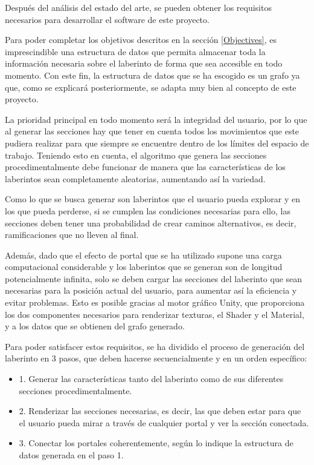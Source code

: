 \documentclass[../main.tex]{subfiles}
\begin{document}
Después del análisis del estado del arte, se pueden obtener los requisitos necesarios para desarrollar el software de este proyecto.

Para poder completar los objetivos descritos en la sección \ref{Objectives}, es imprescindible una estructura de datos que permita almacenar toda la información necesaria sobre el laberinto de forma que sea accesible en todo momento. Con este fin, la estructura de datos que se ha escogido es un grafo ya que, como se explicará posteriormente, se adapta muy bien al concepto de este proyecto.

La prioridad principal en todo momento será la integridad del usuario, por lo que al generar las secciones hay que tener en cuenta todos los movimientos que este pudiera realizar para que siempre se encuentre dentro de los límites del espacio de trabajo. Teniendo esto en cuenta, el algoritmo que genera las secciones procedimentalmente debe funcionar de manera que las características de los laberintos sean completamente aleatorias, aumentando así la variedad. 

Como lo que se busca generar son laberintos que el usuario pueda explorar y en los que pueda perderse, si se cumplen las condiciones necesarias para ello, las secciones deben tener una probabilidad de crear caminos alternativos, es decir, ramificaciones que no lleven al final. 

Además, dado que el efecto de portal que se ha utilizado supone una carga computacional considerable y los laberintos que se generan son de longitud potencialmente infinita, solo se deben cargar las secciones del laberinto que sean necesarias para la posición actual del usuario, para aumentar así la eficiencia y evitar problemas. Esto es posible gracias al motor gráfico Unity, que proporciona los dos componentes necesarios para renderizar texturas, el Shader y el Material, y a los datos que se obtienen del grafo generado.

Para poder satisfacer estos requisitos, se ha dividido el proceso de generación del laberinto en 3 pasos, que deben hacerse secuencialmente y en un orden específico:

\begin{itemize}
    \item 1. Generar las características tanto del laberinto como de sus diferentes secciones procedimentalmente.
    \item 2. Renderizar las secciones necesarias, es decir, las que deben estar para que el usuario pueda mirar a través de cualquier portal y ver la sección conectada.
    \item 3. Conectar los portales coherentemente, según lo indique la estructura de datos generada en el paso 1.
\end{itemize}
\end{document}
